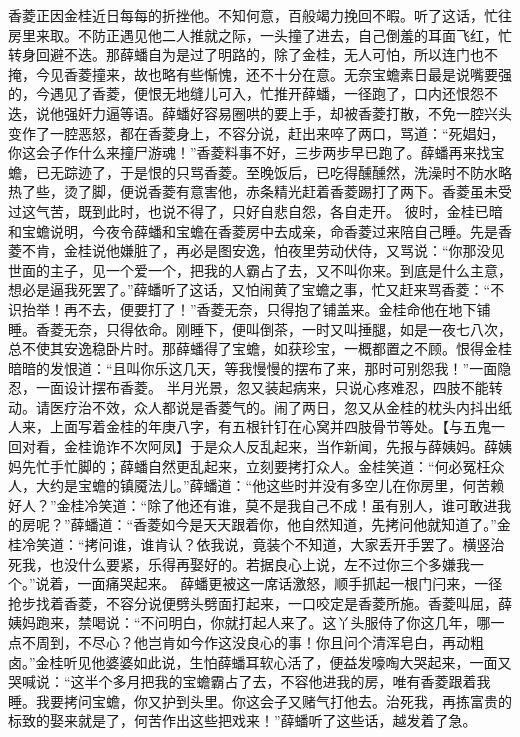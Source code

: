 \documentclass[12pt,oneside]{book}
\begin{document}
香菱正因金桂近日每每的折挫他。不知何意，百般竭力挽回不暇。听了这话，忙往房里来取。不防正遇见他二人推就之际，一头撞了进去，自己倒羞的耳面飞红，忙转身回避不迭。那薛蟠自为是过了明路的，除了金桂，无人可怕，所以连门也不掩，今见香菱撞来，故也略有些惭愧，还不十分在意。无奈宝蟾素日最是说嘴要强的，今遇见了香菱，便恨无地缝儿可入，忙推开薛蟠，一径跑了，口内还恨怨不迭，说他强奸力逼等语。薛蟠好容易圈哄的要上手，却被香菱打散，不免一腔兴头变作了一腔恶怒，都在香菱身上，不容分说，赶出来啐了两口，骂道：“死娼妇，你这会子作什么来撞尸游魂！”香菱料事不好，三步两步早已跑了。薛蟠再来找宝蟾，已无踪迹了，于是恨的只骂香菱。至晚饭后，已吃得醺醺然，洗澡时不防水略热了些，烫了脚，便说香菱有意害他，赤条精光赶着香菱踢打了两下。香菱虽未受过这气苦，既到此时，也说不得了，只好自悲自怨，各自走开。
彼时，金桂已暗和宝蟾说明，今夜令薛蟠和宝蟾在香菱房中去成亲，命香菱过来陪自己睡。先是香菱不肯，金桂说他嫌脏了，再必是图安逸，怕夜里劳动伏侍，又骂说：“你那没见世面的主子，见一个爱一个，把我的人霸占了去，又不叫你来。到底是什么主意，想必是逼我死罢了。”薛蟠听了这话，又怕闹黄了宝蟾之事，忙又赶来骂香菱：“不识抬举！再不去，便要打了！”香菱无奈，只得抱了铺盖来。金桂命他在地下铺睡。香菱无奈，只得依命。刚睡下，便叫倒茶，一时又叫捶腿，如是一夜七八次，总不使其安逸稳卧片时。那薛蟠得了宝蟾，如获珍宝，一概都置之不顾。恨得金桂暗暗的发恨道：“且叫你乐这几天，等我慢慢的摆布了来，那时可别怨我！”一面隐忍，一面设计摆布香菱。
半月光景，忽又装起病来，只说心疼难忍，四肢不能转动。请医疗治不效，众人都说是香菱气的。闹了两日，忽又从金桂的枕头内抖出纸人来，上面写着金桂的年庚八字，有五根针钉在心窝并四肢骨节等处。【与五鬼一回对看，金桂诡诈不次阿凤】于是众人反乱起来，当作新闻，先报与薛姨妈。薛姨妈先忙手忙脚的；薛蟠自然更乱起来，立刻要拷打众人。金桂笑道：“何必冤枉众人，大约是宝蟾的镇魇法儿。”薛蟠道：“他这些时并没有多空儿在你房里，何苦赖好人？”金桂冷笑道：“除了他还有谁，莫不是我自己不成！虽有别人，谁可敢进我的房呢？”薛蟠道：“香菱如今是天天跟着你，他自然知道，先拷问他就知道了。”金桂冷笑道：“拷问谁，谁肯认？依我说，竟装个不知道，大家丢开手罢了。横竖治死我，也没什么要紧，乐得再娶好的。若据良心上说，左不过你三个多嫌我一个。”说着，一面痛哭起来。
薛蟠更被这一席话激怒，顺手抓起一根门闩来，一径抢步找着香菱，不容分说便劈头劈面打起来，一口咬定是香菱所施。香菱叫屈，薛姨妈跑来，禁喝说：“不问明白，你就打起人来了。这丫头服侍了你这几年，哪一点不周到，不尽心？他岂肯如今作这没良心的事！你且问个清浑皂白，再动粗卤。”金桂听见他婆婆如此说，生怕薛蟠耳软心活了，便益发嚎啕大哭起来，一面又哭喊说：“这半个多月把我的宝蟾霸占了去，不容他进我的房，唯有香菱跟着我睡。我要拷问宝蟾，你又护到头里。你这会子又赌气打他去。治死我，再拣富贵的标致的娶来就是了，何苦作出这些把戏来！”薛蟠听了这些话，越发着了急。
\end{document}
